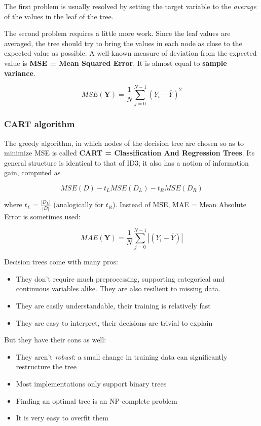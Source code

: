\documentclass[a4paper]{article}
\begin{document}
	The first problem is usually resolved by setting the target variable to the \textit{average}
	of the values in the leaf of the tree.

	The second problem requires a little more work. Since the leaf values are averaged,
	the tree should try to bring the values in each node as close to the expected value
	as possible. A well-known measure of deviation from the expected value is
	\textbf{MSE = Mean Squared Error}. It is almost equal to \textbf{sample variance}.

	$$MSE(\boldsymbol{Y}) = \frac{1}{N} \sum_{j = 0}^{N - 1} (Y_i - \overline{Y})^2$$

	\subsubsection{CART algorithm}
	The greedy algorithm, in which nodes of the decision tree are chosen so as to minimize
	MSE is called \textbf{CART = Classification And Regression Trees}. Its general structure
	is identical to that of ID3; it also has a notion of information gain, computed as

	$$MSE(D) - t_L MSE(D_L) - t_R MSE(D_R)$$

	where $t_L = \frac{|D_L|}{|D|}$ (analogically for $t_R$). Instead of MSE, MAE = Mean
	Absolute Error is sometimes used:

	$$MAE(\boldsymbol{Y}) = \frac{1}{N} \sum_{j = 0}^{N - 1} |(Y_i - \overline{Y})|$$

	Decision trees come with many pros:
	\begin{itemize}
		\item They don't require much preprocessing, supporting categorical and continuous
			variables alike. They are also resilient to missing data.
		\item They are easily understandable, their training is relatively fast
		\item They are easy to interpret, their decisions are trivial to explain
	\end{itemize}
	But they have their cons as well:
	\begin{itemize}
		\item They aren't \textit{robust}: a small change in training data can significantly
			restructure the tree
		\item Most implementations only support binary trees
		\item Finding an optimal tree is an NP-complete problem
		\item It is very easy to overfit them
	\end{itemize}
\end{document}
